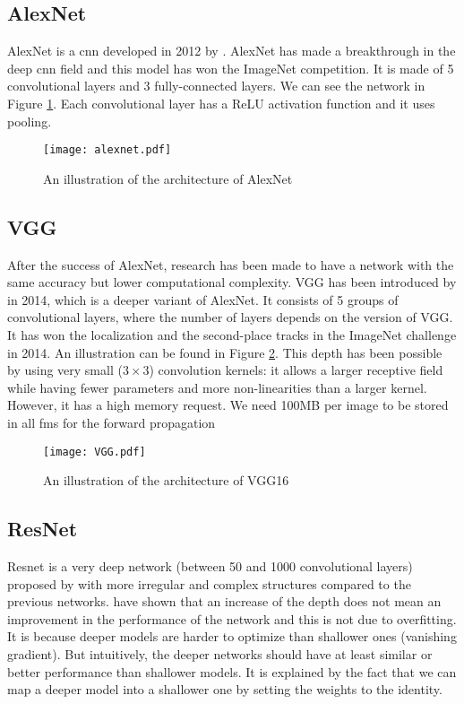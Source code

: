 \subsection{AlexNet}
AlexNet is a \acrshort{cnn} developed in 2012 by \textcite{krizhevsky_imagenet_2012}. AlexNet has made a breakthrough in the deep \acrshort{cnn} field and this model has won the ImageNet competition. It is made of 5 convolutional layers and 3 fully-connected layers. We can see the network in Figure \ref{fig:alexnet}. Each convolutional layer has a ReLU activation function and it uses pooling.
%
\begin{figure}
    \centering
    \texttt{[image: alexnet.pdf]}
    \caption{An illustration of the architecture of AlexNet \cite{krizhevsky_imagenet_2012}}
    \label{fig:alexnet}
\end{figure}
%
\subsection{VGG}
After the success of AlexNet, research has been made to have a network with the same accuracy but lower computational complexity. VGG has been introduced by \textcite{simonyan_very_2015} in 2014, which is a deeper variant of AlexNet. It consists of 5 groups of convolutional layers, where the number of layers depends on the version of VGG. It has won the localization and the second-place tracks in the ImageNet challenge in 2014. An illustration can be found in Figure \ref{fig:vgg}. This depth has been possible by using very small ($3 \times 3$) convolution kernels: it allows a larger receptive field while having fewer parameters and more non-linearities than a larger kernel. However, it has a high memory request. We need 100MB per image to be stored in all \acrshort{fm}s for the forward propagation
%
\begin{figure}
    \centering
    \texttt{[image: VGG.pdf]}
    \caption{An illustration of the architecture of VGG16 \cite{simonyan_very_2015}}
    \label{fig:vgg}
\end{figure}
%
\subsection{ResNet}
Resnet is a very deep network (between 50 and 1000 convolutional layers) proposed by \textcite{he_deep_2015} with more irregular and complex structures compared to the previous networks. \textcite{he_deep_2015} have shown that an increase of the depth does not mean an improvement in the performance of the network and this is not due to overfitting. It is because deeper models are harder to optimize than shallower ones (vanishing gradient). But intuitively, the deeper networks should have at least similar or better performance than shallower models. It is explained by the fact that we can map a deeper model into a shallower one by setting the weights to the identity.


